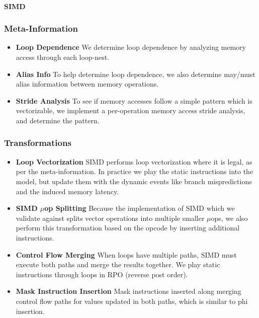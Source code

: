 \paragraph{SIMD}

\subsubsection*{Meta-Information}
\begin{itemize}
  \item \textbf{Loop Dependence}
   We determine loop dependence by analyzing memory access through each loop-nest.
  \item \textbf{Alias Info}
  To help determine loop dependence, we 
  also determine may/must alias information between memory operations.
  \item \textbf{Stride Analysis}
  To see if memory accesses follow a simple pattern which is vectorizable, we implement
  a per-operation memory access stride analysis, and determine the pattern.
\end{itemize}

\subsubsection*{Transformations}
\begin{itemize}
  \item \textbf{Loop Vectorization}
  SIMD performs loop vectorization where it is legal, as per the meta-information. 
  In practice we play the static instructions into the model, but update them with 
  the dynamic events like branch mispredictions and the induced memory latency.
  \item \textbf{SIMD $\mu$op Splitting}
  Because the implementation of SIMD which we validate against splits vector operations
  into multiple smaller $\mu$ops, we also perform this transformation based on
  the opcode by inserting additional instructions.
  \item \textbf{Control Flow Merging}
  When loops have multiple paths, SIMD must execute both paths and merge the
  results together.  We play static instructions through loops in RPO (reverse post order).
  \item \textbf{Mask Instruction Insertion}
  Mask instructions inserted along merging control flow paths for values updated
  in both paths, which is similar to phi insertion.
\end{itemize}



